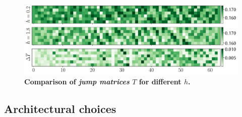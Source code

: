 \begin{figure}[h]
	\centering
	\includegraphics[width=1\linewidth]{Chapter5/Figs/Vector/rate_compare2}
	\caption[Comparison of \emph{jump matrices} $T$ for different batch types]{\textbf{Comparison of \emph{jump matrices} $T$ for different $h$.}}
	\label{fig:ratecompare2}
\end{figure}


\newpage
\subsection{Architectural choices}
